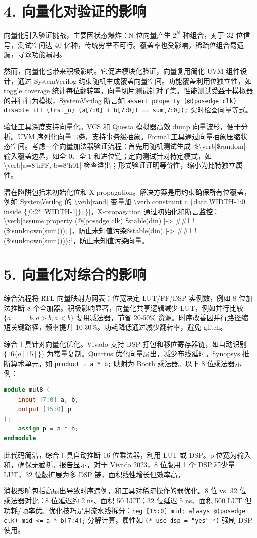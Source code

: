 \chapter{4. 向量化对验证的影响}
向量化引入验证挑战，主要因状态爆炸：N 位向量产生 $2^N$ 种组合，对于 32 位信号，测试空间达 40 亿种，传统穷举不可行。覆盖率也受影响，稀疏位组合易遗漏，导致功能漏洞。\par
然而，向量化也带来积极影响。它促进模块化验证，向量复用简化 UVM 组件设计，通过 SystemVerilog 约束随机生成覆盖向量空间。功能覆盖利用位独立性，如 toggle coverage 统计每位翻转率，向量切片测试针对子集。性能测试受益于模拟器的并行行为模拟，SystemVerilog 断言如 \texttt{assert property (@(posedge clk) disable iff (!rst\_{}n) (a[7:0] + b[7:0]) == sum[7:0]);} 实时检查向量等式。\par
验证工具深度支持向量化。VCS 和 Questa 模拟器高效 dump 向量波形，便于分析。UVM 序列化向量事务，支持事务级抽象。Formal 工具通过向量抽象压缩状态空间。考虑一个向量加法器验证流程：首先用随机测试生成 `\${}\textbackslash{}verb|\${}random| 输入覆盖边界，如全 0、全 1 和进位链；定向测试针对特定模式，如 \textbackslash{}verb|a=8'hFF, b=8'h01| 检查溢出；形式验证证明等价性，缩小为比特独立属性。\par
潜在陷阱包括未初始化位和 X-propagation。解决方案是用约束确保所有位覆盖，例如 SystemVerilog 的 \textbackslash{}verb|rand| 变量加 \textbackslash{}verb|constraint c \{{}data[WIDTH-1:0] inside \{{}[0:2**WIDTH-1]\}{}; \}{}|。X-propagation 通过初始化和断言监控：\textbackslash{}verb|assume property (@(posedge clk) \${}stable(din) |-> \#{}\#{}1 !(\${}isunknown(sum))); |，防止未知值污染\${}stable(din) |-> \#{}\#{}1 !(\${}isunknown(sum)))\}{};`，防止未知值污染向量。\par
\chapter{5. 向量化对综合的影响}
综合流程将 RTL 向量映射为网表：位宽决定 LUT/FF/DSP 实例数，例如 8 位加法推断 8 个全加器。积极影响显著，向量化共享逻辑减少 LUT，例如并行比较 $\{a==b, a>b, a<b\}$ 复用减法器，节省 20-50\%{} 资源。时序改善因并行路径缩短关键路径，频率提升 10-30\%{}。功耗降低通过减少翻转率，避免 glitch。\par
综合工具针对向量化优化。Vivado 支持 DSP 打包和移位寄存器链，如自动识别 $\{16\{a[15]\}\}$ 为常量复制。Quartus 优化向量扇出，减少布线延时。Synopsys 推断算术单元，如 \texttt{product = a * b;} 映射为 Booth 乘法器。以下 8 位乘法器示例：\par
\begin{lstlisting}[language=verilog]
module mul8 (
    input [7:0] a, b,
    output [15:0] p
);
    assign p = a * b;
endmodule
\end{lstlisting}
此代码简洁，综合工具自动推断 16 位乘法器，利用 LUT 或 DSP。p 位宽为输入和，确保无截断。报告显示，对于 Vivado 2023，8 位版用 1 个 DSP 和少量 LUT，32 位版扩展为多 DSP 链，面积线性增长但效率高。\par
消极影响包括高扇出导致时序违例，和工具对稀疏操作的弱优化。8 位 vs. 32 位乘法器对比：8 位延迟约 2 ns、面积 50 LUT；32 位延迟 5 ns、面积 500 LUT 但功耗/帧率优。优化技巧是用流水线拆分：\texttt{reg [15:0] mid; always @(posedge clk) mid <= a * b[7:4];} 分解计算。属性如 \texttt{(* use\_{}dsp = "yes" *)} 强制 DSP 使用。\par
